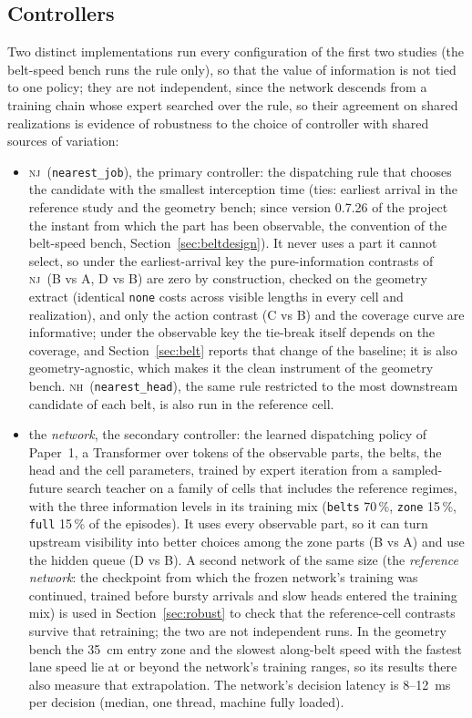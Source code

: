 \documentclass[11pt,a4paper]{article}
\newcommand{\nj}{\textsc{nj}}
\newcommand{\nh}{\textsc{nh}}
\begin{document}
\subsection{Controllers}
Two distinct implementations run every configuration of the first two studies (the
belt-speed bench runs the rule only), so that the value of information is not tied to one
policy; they are not independent, since the network descends from a training chain whose
expert searched over the rule, so their agreement on shared realizations is evidence of
robustness to the choice of controller with shared sources of variation:
\begin{itemize}[nosep]
\item \nj\ (\texttt{nearest\_job}), the primary controller: the dispatching rule that
  chooses the candidate with the smallest interception time (ties: earliest arrival in
  the reference study and the geometry bench; since version 0.7.26 of the project the
  instant from which the part has been observable, the convention of the belt-speed
  bench, Section~\ref{sec:beltdesign}). It
  never uses a part it cannot select, so under the earliest-arrival key the
  pure-information contrasts of \nj\ (B vs A, D vs B) are zero by construction, checked
  on the geometry extract (identical \texttt{none} costs across visible lengths in every
  cell and realization), and only the action contrast (C vs B) and the coverage curve
  are informative; under the observable key the tie-break itself depends on the
  coverage, and Section~\ref{sec:belt} reports that change of the baseline; it is also geometry-agnostic, which makes it the clean
  instrument of the geometry bench. \nh\ (\texttt{nearest\_head}), the same rule restricted
  to the most downstream candidate of each belt, is also run in the reference cell.
\item the \emph{network}, the secondary controller: the learned dispatching policy of
  Paper~1, a Transformer over tokens of the observable parts, the belts, the head and the
  cell parameters, trained by expert iteration from a sampled-future search teacher on a
  family of cells that includes the reference regimes, with the three information levels
  in its training mix (\texttt{belts} 70\,\%, \texttt{zone} 15\,\%, \texttt{full} 15\,\%
  of the episodes). It uses every observable part, so it can turn upstream visibility into
  better choices among the zone parts (B vs A) and use the hidden queue (D vs B). A second
  network of the same size (the \emph{reference network}: the checkpoint from which the
  frozen network's training was continued, trained before bursty arrivals and slow heads
  entered the training mix) is used in Section~\ref{sec:robust} to check that the
  reference-cell contrasts survive that retraining; the two are not independent runs. In
  the geometry bench the 35~cm entry zone and the slowest along-belt speed with the fastest
  lane speed lie at or beyond the network's training ranges, so its results there also
  measure that extrapolation. The network's decision latency is 8--12~ms per decision
  (median, one thread, machine fully loaded).
\end{itemize}
\end{document}
